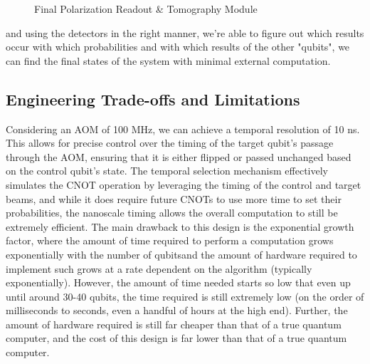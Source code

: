 \documentclass[12pt]{amsart}
\newcommand{\xsfit}{\scriptsize}
\begin{document}
\begin{figure}[H]
\caption{Final Polarization Readout \& Tomography Module}
\label{fig:final-detector}

\end{figure}

and using the detectors in the right manner, we're able to figure out which results occur with which probabilities and with which results of the other "qubits", we can find the final states of the system with minimal external computation.

\subsection{Engineering Trade-offs and Limitations}
    \label{sec:Engineering Trade-offs and Limitations}
Considering an AOM of 100 MHz, we can achieve a temporal resolution of 10 ns. This allows for precise control over the timing of the target qubit's passage through the AOM, ensuring that it is either flipped or passed unchanged based on the control qubit's state. The temporal selection mechanism effectively simulates the CNOT operation by leveraging the timing of the control and target beams, and while it does require future CNOTs to use more time to set their probabilities, the nanoscale timing allows the overall computation to still be extremely efficient. The main drawback to this design is the exponential growth factor, where the amount of time required to perform a computation grows exponentially with the number of qubitsand the amount of hardware required to implement such grows at a rate dependent on the algorithm (typically exponentially). However, the amount of time needed starts so low that even up until around 30-40 qubits, the time required is still extremely low (on the order of milliseconds to seconds, even a handful of hours at the high end). Further, the amount of hardware required is still far cheaper than that of a true quantum computer, and the cost of this design is far lower than that of a true quantum computer. 
\end{document}
